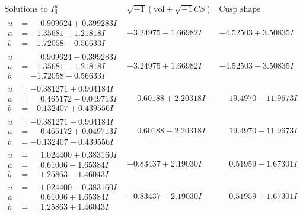 \documentclass[1p]{elsarticle_modified}
\theoremstyle{definition}
\newcommand{\I}{\sqrt{-1}}
\begin{document}
$$\begin{array}{c|c|c}  
\text{Solutions to }I^u_{3}& \I (\text{vol} + \sqrt{-1}CS) & \text{Cusp shape}\\
 \hline 
\begin{aligned}
u &= \phantom{-}0.909624 + 0.399283 I \\
a &= -1.35681 + 1.21818 I \\
b &= -1.72058 + 0.56633 I\end{aligned}
 & -3.24975 - 1.66982 I & -4.52503 + 3.50835 I \\ \hline\begin{aligned}
u &= \phantom{-}0.909624 - 0.399283 I \\
a &= -1.35681 - 1.21818 I \\
b &= -1.72058 - 0.56633 I\end{aligned}
 & -3.24975 + 1.66982 I & -4.52503 - 3.50835 I \\ \hline\begin{aligned}
u &= -0.381271 + 0.904184 I \\
a &= \phantom{-}0.465172 - 0.049713 I \\
b &= -0.132407 + 0.439556 I\end{aligned}
 & \phantom{-}0.60188 + 2.20318 I & \phantom{-}19.4970 - 11.9673 I \\ \hline\begin{aligned}
u &= -0.381271 - 0.904184 I \\
a &= \phantom{-}0.465172 + 0.049713 I \\
b &= -0.132407 - 0.439556 I\end{aligned}
 & \phantom{-}0.60188 - 2.20318 I & \phantom{-}19.4970 + 11.9673 I \\ \hline\begin{aligned}
u &= \phantom{-}1.024400 + 0.383160 I \\
a &= \phantom{-}0.61006 - 1.65384 I \\
b &= \phantom{-}1.25863 - 1.46043 I\end{aligned}
 & -0.83437 + 2.19030 I & \phantom{-}0.51959 - 1.67301 I \\ \hline\begin{aligned}
u &= \phantom{-}1.024400 - 0.383160 I \\
a &= \phantom{-}0.61006 + 1.65384 I \\
b &= \phantom{-}1.25863 + 1.46043 I\end{aligned}
 & -0.83437 - 2.19030 I & \phantom{-}0.51959 + 1.67301 I \\ \hline\begin{aligned}

\end{aligned}
\end{array}$$
\end{document}

